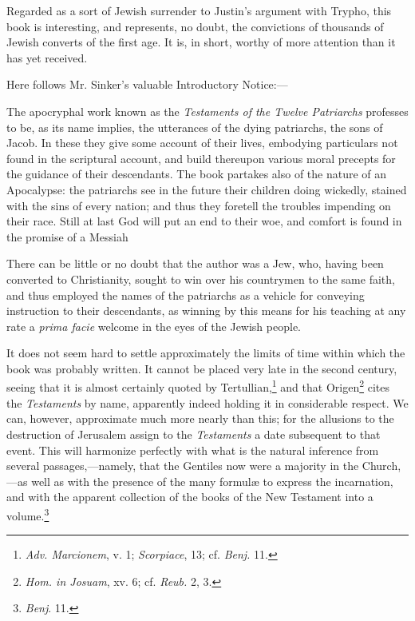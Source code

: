 Regarded as a sort of Jewish surrender to Justin’s argument with Trypho, this book is interesting, and represents, no doubt, the convictions of thousands of Jewish converts of the first age. It is, in short, worthy of more attention than it has yet received.

Here follows Mr. Sinker’s valuable Introductory Notice:—

The apocryphal work known as the \emph{Testaments of the Twelve Patriarchs} professes to be, as its name implies, the utterances of the dying patriarchs, the sons of Jacob. In these they give some account of their lives, embodying particulars not found in the scriptural account, and build thereupon various moral precepts for the guidance of their descendants. The book partakes also of the nature of an Apocalypse: the patriarchs see in the future their children doing wickedly, stained with the sins of every nation; and thus they foretell the troubles impending on their race. Still at last God will put an end to their woe, and comfort is found in the promise of a Messiah

There can be little or no doubt that the author was a Jew, who, having been converted to Christianity, sought to win over his countrymen to the same faith, and thus employed the names of the patriarchs as a vehicle for conveying instruction to their descendants, as winning by this means for his teaching at any rate a \emph{prima facie} welcome in the eyes of the Jewish people.

It does not seem hard to settle approximately the limits of time within which the book was probably written. It cannot be placed very late in the second century, seeing that it is almost certainly quoted by Tertullian,\footnote{\emph{Adv. Marcionem}, v. 1; \emph{Scorpiace}, 13; cf. \emph{Benj.} 11.} and that Origen\footnote{\emph{Hom. in Josuam}, xv. 6; cf. \emph{Reub.} 2, 3.} cites the \emph{Testaments} by name, apparently indeed holding it in considerable respect. We can, however, approximate much more nearly than this; for the allusions to the destruction of Jerusalem assign to the \emph{Testaments} a date subsequent to that event. This will harmonize perfectly with what is the natural inference from several passages,—namely, that the Gentiles now were a majority in the Church,—as well as with the presence of the many formulæ to express the incarnation, and with the apparent collection of the books of the New Testament into a volume.\footnote{\emph{Benj}. 11.}

